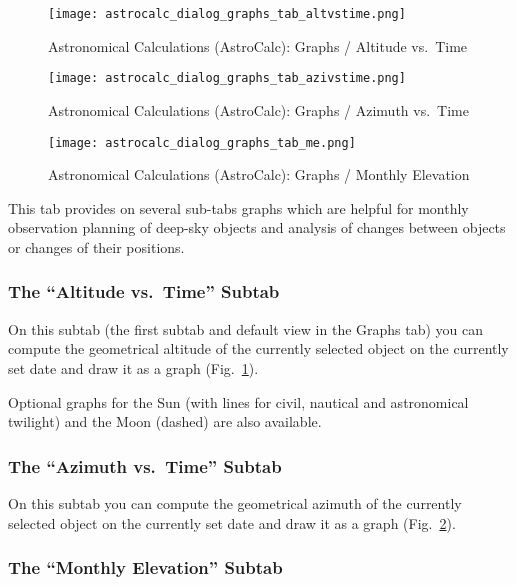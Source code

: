 \begin{figure}[p]
\centering\texttt{[image: astrocalc\_dialog\_graphs\_tab\_altvstime.png]}
\caption{Astronomical Calculations (AstroCalc): Graphs / Altitude vs.\ Time}
\label{fig:gui:AstroCalc:Graphs:AltVsTime}
\end{figure}
\begin{figure}[p]
\centering\texttt{[image: astrocalc\_dialog\_graphs\_tab\_azivstime.png]}
\caption{Astronomical Calculations (AstroCalc): Graphs / Azimuth vs.\ Time}
\label{fig:gui:AstroCalc:Graphs:AziVsTime}
\end{figure}
\begin{figure}[p]
\centering\texttt{[image: astrocalc\_dialog\_graphs\_tab\_me.png]}
\caption{Astronomical Calculations (AstroCalc): Graphs / Monthly Elevation}
\label{fig:gui:AstroCalc:Graphs:ME}
\end{figure}


This tab provides on several sub-tabs
 graphs which are helpful for monthly observation
planning of deep-sky objects and analysis of changes between objects
or changes of their positions.

\subsubsection{The ``Altitude vs.\ Time'' Subtab}
\label{sec:gui:AstroCalc:Graphs:AltVsTime}
  
On this subtab (the first subtab and default view in the Graphs tab) you can compute the geometrical altitude of the currently selected object 
on the currently set date and draw it as a graph (Fig.~\ref{fig:gui:AstroCalc:Graphs:AltVsTime}).

Optional graphs for the Sun (with lines for civil, nautical and astronomical twilight) and the Moon (dashed) are also available.

\subsubsection{The ``Azimuth vs.\ Time'' Subtab}
\label{sec:gui:AstroCalc:Graphs:AziVsTime}
  
On this subtab  you can compute the geometrical azimuth of the currently selected object 
on the currently set date and draw it as a graph (Fig.~\ref{fig:gui:AstroCalc:Graphs:AziVsTime}).
    
\subsubsection{The ``Monthly Elevation'' Subtab}
\label{sec:gui:AstroCalc:Graphs:ME}

